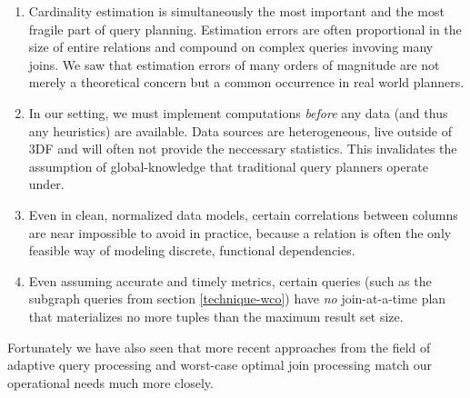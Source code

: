\documentclass[../index.tex]{subfiles}
\begin{document}
\begin{enumerate}
  \item
    Cardinality estimation is simultaneously the most important and
    the most fragile part of query planning. Estimation errors are
    often proportional in the size of entire relations and compound on
    complex queries invoving many joins. We saw that estimation errors
    of many orders of magnitude are not merely a theoretical concern
    but a common occurrence in real world planners.

  \item
    In our setting, we must implement computations \emph{before} any
    data (and thus any heuristics) are available. Data sources are
    heterogeneous, live outside of 3DF and will often not provide the
    neccessary statistics. This invalidates the assumption of
    global-knowledge that traditional query planners operate under.

  \item
    Even in clean, normalized data models, certain correlations
    between columns are near impossible to avoid in practice, because
    a relation is often the only feasible way of modeling discrete,
    functional dependencies.

  \item
    Even assuming accurate and timely metrics, certain queries (such
    as the subgraph queries from section \ref{technique-wco}) have
    \emph{no} join-at-a-time plan that materializes no more tuples
    than the maximum result set size.
\end{enumerate}

Fortunately we have also seen that more recent approaches from the
field of adaptive query processing and worst-case optimal join
processing match our operational needs much more closely.
\end{document}
